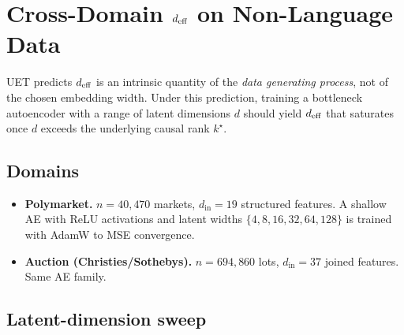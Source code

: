 \section{Cross-Domain $d_{\mathrm{eff}}$ on Non-Language Data}
\label{sec:cross}

UET predicts $d_{\mathrm{eff}}$ is an intrinsic quantity of the \emph{data
generating process}, not of the chosen embedding width. Under this
prediction, training a bottleneck autoencoder with a range of latent
dimensions $d$ should yield $d_{\mathrm{eff}}$ that saturates once $d$ exceeds the
underlying causal rank $k^\star$.

\subsection{Domains}
\begin{itemize}[leftmargin=1.5em,itemsep=1pt]
\item \textbf{Polymarket.} $n = 40{,}470$ markets, $d_{\text{in}} = 19$
      structured features. A shallow AE with ReLU activations and
      latent widths $\{4, 8, 16, 32, 64, 128\}$ is trained with AdamW
      to MSE convergence.
\item \textbf{Auction (Christies/Sothebys).} $n = 694{,}860$ lots,
      $d_{\text{in}} = 37$ joined features. Same AE family.
\end{itemize}

\subsection{Latent-dimension sweep}

